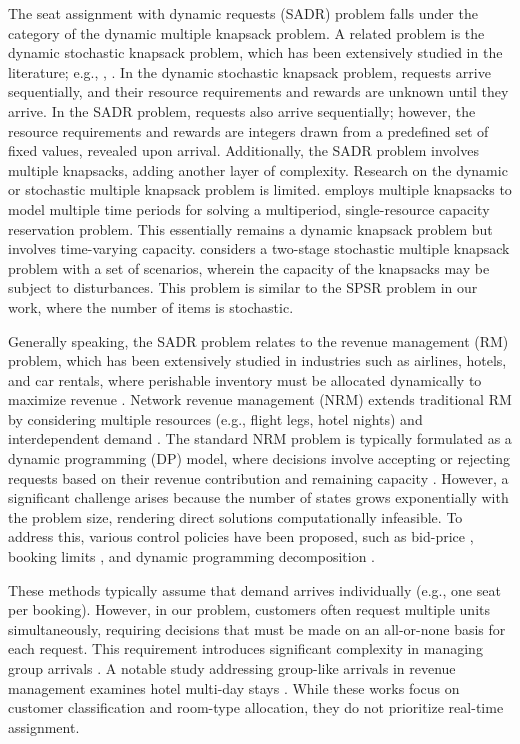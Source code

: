 The seat assignment with dynamic requests (SADR) problem falls under the category of the dynamic multiple knapsack problem. A related problem is the dynamic stochastic knapsack problem, which has been extensively studied in the literature; e.g., \citet{kleywegt1998dynamic, kleywegt2001dynamic}, \citet{papastavrou1996dynamic}. In the dynamic stochastic knapsack problem, requests arrive sequentially, and their resource requirements and rewards are unknown until they arrive. In the SADR problem, requests also arrive sequentially; however, the resource requirements and rewards are integers drawn from a predefined set of fixed values, revealed upon arrival. Additionally, the SADR problem involves multiple knapsacks, adding another layer of complexity.
Research on the dynamic or stochastic multiple knapsack problem is limited. \citet{perry2009approximate} employs multiple knapsacks to model multiple time periods for solving a multiperiod, single-resource capacity reservation problem. This essentially remains a dynamic knapsack problem but involves time-varying capacity. \citet{tonissen2017column} considers a two-stage stochastic multiple knapsack problem with a set of scenarios, wherein the capacity of the knapsacks may be subject to disturbances. This problem is similar to the SPSR problem in our work, where the number of items is stochastic.


Generally speaking, the SADR problem relates to the revenue management (RM) problem, which has been extensively studied in industries such as airlines, hotels, and car rentals, where perishable inventory must be allocated dynamically to maximize revenue \citep{van2005introduction}. Network revenue management (NRM) extends traditional RM by considering multiple resources (e.g., flight legs, hotel nights) and interdependent demand \citep{williamson1992airline}. The standard NRM problem is typically formulated as a dynamic programming (DP) model, where decisions involve accepting or rejecting requests based on their revenue contribution and remaining capacity \citep{talluri1998analysis}. However, a significant challenge arises because the number of states grows exponentially with the problem size, rendering direct solutions computationally infeasible. To address this, various control policies have been proposed, such as bid-price \citep{adelman2007dynamic, bertsimas2003revenue}, booking limits \citep{gallego1997multiproduct}, and dynamic programming decomposition \citep{talluri2006theory, liu2008choice}. 


These methods typically assume that demand arrives individually (e.g., one seat per booking). However, in our problem, customers often request multiple units simultaneously, requiring decisions that must be made on an all-or-none basis for each request. This requirement introduces significant complexity in managing group arrivals \citep{talluri2006theory}. A notable study addressing group-like arrivals in revenue management examines hotel multi-day stays \citep{bitran1995application, goldman2002models, aydin2018decomposition}. While these works focus on customer classification and room-type allocation, they do not prioritize real-time assignment.


